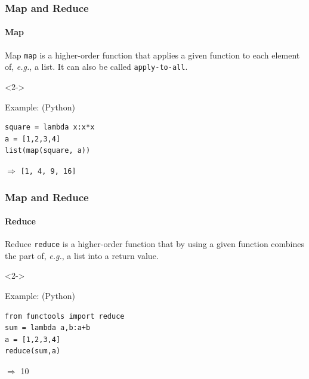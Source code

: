 \documentclass[aspectratio=169,dvipsnames]{beamer}
\begin{document}
    \begin{frame}[fragile]
        \frametitle{Map and Reduce}
        \framesubtitle{Map}

            \begin{block}{Map}
                \texttt{map} is a higher-order function that applies a given
                function to each element of, \textit{e.g.}, a list. It can also
                be called \texttt{apply-to-all}.
            \end{block}
            \begin{uncoverenv}<2->
            \begin{block}{Example: \hfill \small(Python)}
            \begin{center}
            \begin{minipage}{0.8\linewidth}
            \begin{lstlisting}
square = lambda x:x*x
a = [1,2,3,4]
list(map(square, a))
            \end{lstlisting}
            $\Rightarrow$ \texttt{[1, 4, 9, 16]}
            \end{minipage}
            \end{center}
            \end{block}
            \end{uncoverenv}
        
    \end{frame}
    
    \begin{frame}[fragile]
        \frametitle{Map and Reduce}
        \framesubtitle{Reduce}

            \begin{block}{Reduce}
                \texttt{reduce} is a higher-order function that by using a
                given function combines the part of, \textit{e.g.}, a list into
                a return value.
            \end{block}
            \begin{uncoverenv}<2->
            \begin{block}{Example: \hfill \small(Python)}
            \begin{center}
            \begin{minipage}{0.8\linewidth}
            \begin{lstlisting}
from functools import reduce
sum = lambda a,b:a+b
a = [1,2,3,4]
reduce(sum,a)
            \end{lstlisting}
            $\Rightarrow$ 10
            \end{minipage}
            \end{center}
            \end{block}
            \end{uncoverenv}
    \end{frame}
\end{document}
